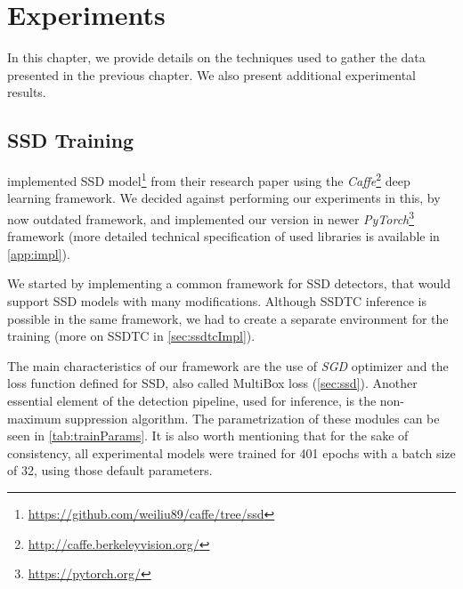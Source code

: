 \chapter{Experiments}
\label{chap:exp}

In this chapter, we provide details on the techniques used to gather the data presented in the previous chapter. We also present additional experimental results.


\section{SSD Training}
\citeauthor{bib:ssd} implemented SSD model\footnote{\url{https://github.com/weiliu89/caffe/tree/ssd}} from their research paper using the \textit{Caffe}\footnote{\url{http://caffe.berkeleyvision.org/}} deep learning framework. We decided against performing our experiments in this, by now outdated framework, and implemented our version in newer \textit{PyTorch}\footnote{\url{https://pytorch.org/}} framework (more detailed technical specification of used libraries is available in \cref{app:impl}).

We started by implementing a common framework for SSD detectors, that would support SSD models with many modifications. Although SSDTC inference is possible in the same framework, we had to create a separate environment for the training (more on SSDTC in \cref{sec:ssdtcImpl}). 

The main characteristics of our framework are the use of \textit{SGD} optimizer \cite{bib:sgd} and the loss function defined for SSD, also called MultiBox loss (\cref{sec:ssd}). Another essential element of the detection pipeline, used for inference, is the non-maximum suppression algorithm. The parametrization of these modules can be seen in \cref{tab:trainParams}. It is also worth mentioning that for the sake of consistency, all experimental models were trained for 401 epochs with a batch size of 32, using those default parameters.

